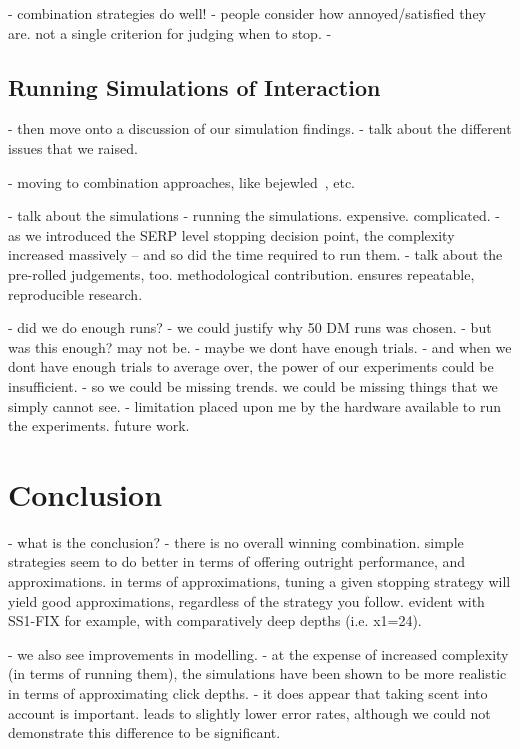 - combination strategies do well!
    - people consider how annoyed/satisfied they are. not a single criterion for judging when to stop.
    -

\subsection{Running Simulations of Interaction}

- then move onto a discussion of our simulation findings.
- talk about the different issues that we raised.

- moving to combination approaches, like bejewled~\cite{zhang2017bejewled}, etc.

- talk about the simulations
    - running the simulations. expensive. complicated.
    - as we introduced the SERP level stopping decision point, the complexity increased massively -- and so did the time required to run them.
    - talk about the pre-rolled judgements, too. methodological contribution. ensures repeatable, reproducible research.

- did we do enough runs?
    - we could justify why 50 DM runs was chosen.
    - but was this enough? may not be.
    - maybe we dont have enough trials.
    - and when we dont have enough trials to average over, the power of our experiments could be insufficient.
        - so we could be missing trends. we could be missing things that we simply cannot see.
        - limitation placed upon me by the hardware available to run the experiments. future work.


\section{Conclusion}

- what is the conclusion?
    - there is no overall winning combination. simple strategies seem to do better in terms of offering outright performance, and approximations. in terms of approximations, tuning a given stopping strategy will yield good approximations, regardless of the strategy you follow. evident with SS1-FIX for example, with comparatively deep depths (i.e. x1=24).

- we also see improvements in modelling.
- at the expense of increased complexity (in terms of running them), the simulations have been shown to be more realistic in terms of approximating click depths.
    - it does appear that taking scent into account is important. leads to slightly lower error rates, although we could not demonstrate this difference to be significant.

